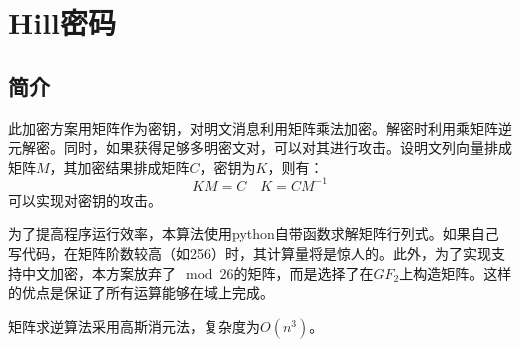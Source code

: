 \documentclass[11pt]{ctexart}
\begin{document}
\section{Hill密码}
\subsection{简介}
此加密方案用矩阵作为密钥，对明文消息利用矩阵乘法加密。解密时利用乘矩阵逆元解密。同时，如果获得足够多明密文对，可以对其进行攻击。设明文列向量排成矩阵$M$，其加密结果排成矩阵$C$，密钥为$K$，则有：
$$KM=C\quad K=CM^{-1}$$
可以实现对密钥的攻击。

为了提高程序运行效率，本算法使用python自带函数求解矩阵行列式。如果自己写代码，在矩阵阶数较高（如256）时，其计算量将是惊人的。此外，为了实现支持中文加密，本方案放弃了$\mod 26$的矩阵，而是选择了在$GF_2$上构造矩阵。这样的优点是保证了所有运算能够在域上完成。

矩阵求逆算法采用高斯消元法，复杂度为$O(n^3)$。
\end{document}
